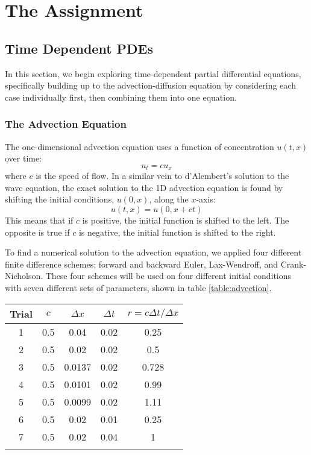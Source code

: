 \message{ !name(austin_report.tex)}\documentclass{article}
\begin{document}

\section{The Assignment}

\subsection{Time Dependent PDEs}

In this section, we begin exploring time-dependent partial
differential equations, specifically building up to the
advection-diffusion equation by considering each case individually
first, then combining them into one equation.

\subsubsection{The Advection Equation}
The one-dimensional advection equation uses a function of
concentration $u(t, x)$ over time:
\begin{equation}
  u_t = c u_x
\end{equation}
where $c$ is the speed of flow. In a similar vein to d'Alembert's
solution to the wave equation, the exact solution to the 1D advection
equation is found by shifting the initial conditions, $u(0, x)$, along
the $x$-axis:
\begin{equation}
  u(t, x) = u(0, x + ct)
\end{equation}
This means that if $c$ is positive, the initial function is shifted to
the left. The opposite is true if $c$ is negative, the initial
function is shifted to the right.

To find a numerical solution to the advection equation, we applied
four different finite difference schemes: forward and backward Euler,
Lax-Wendroff, and Crank-Nicholson. These four schemes will be used on
four different initial conditions with seven different sets of
parameters, shown in table \ref{table:advection}.

\begin{tabular}{c|c|c|c|c}
  Trial & $c$ & $\Delta x$ & $\Delta t$ & $r = c \Delta t / \Delta x$ \\ \hline
  1     & 0.5 & 0.04       & 0.02       & 0.25                        \\ \hline
  2     & 0.5 & 0.02       & 0.02       & 0.5                         \\ \hline
  3     & 0.5 & 0.0137     & 0.02       & 0.728                       \\ \hline
  4     & 0.5 & 0.0101     & 0.02       & 0.99                        \\ \hline
  5     & 0.5 & 0.0099     & 0.02       & 1.11                        \\ \hline
  6     & 0.5 & 0.02       & 0.01       & 0.25                        \\ \hline
  7     & 0.5 & 0.02       & 0.04       & 1                           \\ \hline
  \label{table:advection}
\end{tabular}
\end{document}
